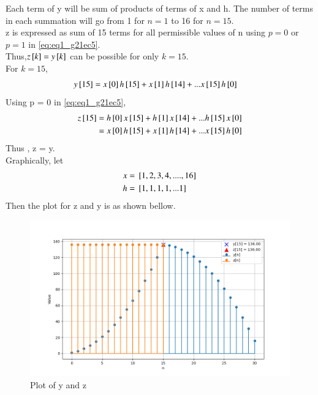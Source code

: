 \documentclass[journal,12pt,twocolumn]{IEEEtran}
\theoremstyle{remark}
\begin{document}
Each term of y will be sum of products of terms of x and h. The number of terms in each summation will go from 1 for $n=1$ to 16 for $n=15$. \\
z is expressed as sum of 15 terms for all permissible values of n using $p=0$ or $p=1$ in \eqref{eq:eq1_g21ec5}.
\\ Thus,$z{}\left[k\right] = y{}\left[k\right]$ can be possible for only $k=15$.
\\ For $k = 15$,
\begin{align}
    y{}\left[15\right] &= x{}\left[0\right]h{}\left[15\right] +  x{}\left[1\right]h{}\left[14\right] + ...  x{}\left[15\right]h{}\left[0\right] 
\end{align}
Using p = 0  in \eqref{eq:eq1_g21ec5},
\begin{align}
    z{}\left[15\right] &= h{}\left[0\right] x{}\left[15\right] + h{}\left[1\right] x{}\left[14\right] + ... h{}\left[15\right] x{}\left[0\right]\\
    &=  x{}\left[0\right]h{}\left[15\right] +  x{}\left[1\right]h{}\left[14\right] + ...  x{}\left[15\right]h{}\left[0\right] 
\end{align}
Thus , z = y.\\
Graphically, let 
\begin{align}
    x &= {}\left[1,2,3,4,....,16\right]\\
    h &= {}\left[1,1,1,1, ... 1\right]
\end{align}
Then the plot for z and y is as shown bellow.
\begin{figure}[!ht]
\centering
\begin{center}
\includegraphics[width=\columnwidth]{Figure_1}
\end{center}
\caption{Plot of y and z}
\end{figure}
\end{document}
